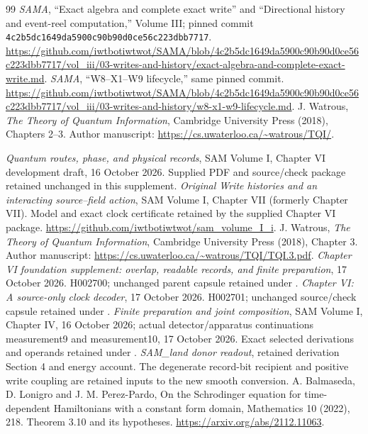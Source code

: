 \begin{thebibliography}{99}
 \emph{SAMA}, ``Exact algebra and complete exact write'' and ``Directional history and event-reel computation,'' Volume III; pinned commit \nolinkurl{4c2b5dc1649da5900c90b90d0ce56c223dbb7717}. \url{https://github.com/iwtbotiwtwot/SAMA/blob/4c2b5dc1649da5900c90b90d0ce56c223dbb7717/vol_iii/03-writes-and-history/exact-algebra-and-complete-exact-write.md}.
 \emph{SAMA}, ``W8--X1--W9 lifecycle,'' same pinned commit. \url{https://github.com/iwtbotiwtwot/SAMA/blob/4c2b5dc1649da5900c90b90d0ce56c223dbb7717/vol_iii/03-writes-and-history/w8-x1-w9-lifecycle.md}.
 J. Watrous, \emph{The Theory of Quantum Information}, Cambridge University Press (2018), Chapters 2--3. Author manuscript: \url{https://cs.uwaterloo.ca/~watrous/TQI/}.

\emph{Quantum routes, phase, and physical records}, SAM Volume I,
Chapter VI development draft, 16 October 2026. Supplied PDF and source/check
package retained unchanged in this supplement.
\emph{Original Write histories and an interacting source--field action},
SAM Volume I, Chapter VII (formerly Chapter VII). Model and exact clock certificate retained by the
supplied Chapter VI package.
\url{https://github.com/iwtbotiwtwot/sam_volume_I_i}.
J. Watrous, \emph{The Theory of Quantum Information}, Cambridge University
Press (2018), Chapter 3. Author manuscript:
\url{https://cs.uwaterloo.ca/~watrous/TQI/TQI.3.pdf}.
\emph{Chapter VI foundation supplement: overlap, readable records, and
finite preparation}, 17 October 2026. H002700; unchanged parent capsule
retained under .
\emph{Chapter VI: A source-only clock decoder}, 17 October 2026.
H002701; unchanged source/check capsule retained under .
\emph{Finite preparation and joint composition}, SAM Volume I, Chapter IV,
16 October 2026; actual detector/apparatus continuations measurement9 and
measurement10, 17 October 2026. Exact selected derivations and operands
retained under .
\emph{SAM\_land donor readout}, retained derivation Section 4 and
energy account. The degenerate record-bit recipient and positive write
coupling are retained inputs to the new smooth conversion.
 A. Balmaseda, D. Lonigro and J. M. Perez-Pardo,
On the Schrodinger equation for time-dependent Hamiltonians with a constant
form domain, Mathematics 10 (2022), 218. Theorem 3.10 and its hypotheses.
\url{https://arxiv.org/abs/2112.11063}.
\end{thebibliography}

